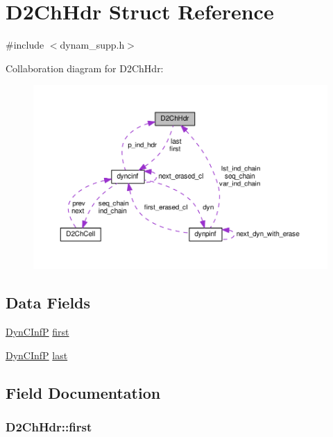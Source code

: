 \hypertarget{structD2ChHdr}{}\section{D2\+Ch\+Hdr Struct Reference}
\label{structD2ChHdr}


{\ttfamily \#include $<$dynam\+\_\+supp.\+h$>$}



Collaboration diagram for D2\+Ch\+Hdr\+:\nopagebreak
\begin{figure}[H]
\begin{center}
\leavevmode
\includegraphics[width=350pt]{structD2ChHdr__coll__graph}
\end{center}
\end{figure}
\subsection*{Data Fields}
\begin{DoxyCompactItemize}
\item 
\hyperlink{dynam__supp_8h_ae9665ae9a3ee194834c9995b875aed48}{Dyn\+C\+InfP} \hyperlink{structD2ChHdr_ac1ff1d6290dd45e018ee4097a2c2427d}{first}
\item 
\hyperlink{dynam__supp_8h_ae9665ae9a3ee194834c9995b875aed48}{Dyn\+C\+InfP} \hyperlink{structD2ChHdr_a35d1cb0c22a72f9a49a6d26b9f8046c8}{last}
\end{DoxyCompactItemize}


\subsection{Field Documentation}
\subsubsection[{\texorpdfstring{first}{first}}]{ D2\+Ch\+Hdr\+::first}\hypertarget{structD2ChHdr_ac1ff1d6290dd45e018ee4097a2c2427d}{}\label{structD2ChHdr_ac1ff1d6290dd45e018ee4097a2c2427d}
